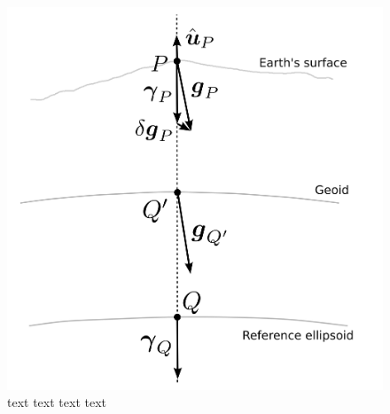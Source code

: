 \documentclass[extra]{gji}
\begin{document}
\begin{figure}
    \includegraphics{figures/surfaces.png}
    \caption{text text text text}
  \label{fig:surfaces}
\end{figure}    
\end{document}
